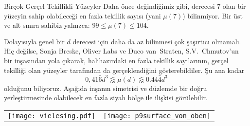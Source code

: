 \begin{surferPage}[216 Tekillik]{Birçok Gerçel Tekillikli Yüzeyler}
Daha önce değindiğimiz gibi, derecesi $7$ olan bir yüzeyin sahip olabileceği en fazla tekillik sayısı (yani $\mu(7)$) bilinmiyor. Bir üst ve alt sınıra sahibiz yalnızca:  $99\le \mu(7) \le 104$. 

Dolayısıyla genel bir $d$ derecesi için daha da az bilinmesi çok şaşırtıcı olmamalı.
Hiç değilse,  Sonja Breske, Oliver Labs ve Duco van~Straten, S.V.\ Chmutov'un bir inşasından yola çıkarak, halihazırdaki en fazla tekillik sayılarının, gerçel tekilliği olan yüzeyler tarafından da gerçeklendiğini gösterebildiler. Şu ana kadar 
    \[0,41\bar{6}d^3 \lessapprox \mu(d) \lessapprox 0.44\bar{4} d^3\]
olduğunu biliyoruz. Aşağıda inşanın simetrisi ve düzlemde bir doğru yerleştirmesinde olabilecek en fazla siyah bölge ile ilişkisi görülebilir.
    \begin{center}
      \begin{tabular}{c@{\qquad}c}
        \texttt{[image: vielesing.pdf]}
        &
        \texttt{[image: p9surface\_von\_oben]}
      \end{tabular}
    \end{center}
\end{surferPage}
